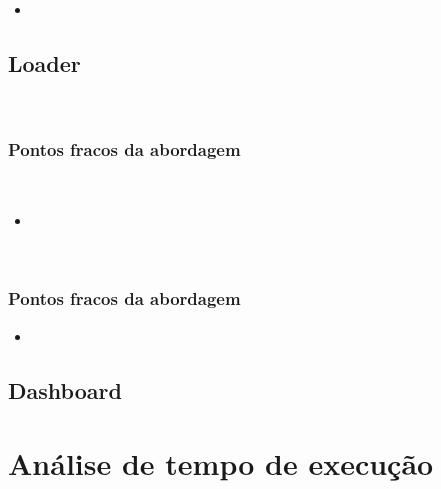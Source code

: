 \documentclass[a4paper,12pt]{article}
\begin{document}
\begin{itemize}
    \item \textbf{} 

\end{itemize}


\subsection*{Loader}
\\



\subsubsection*{Pontos fracos da abordagem}
\\
\begin{itemize}
    \item \textbf{} 
    
\end{itemize}

\vspace{1em}

\\
\subsubsection*{Pontos fracos da abordagem}

\begin{itemize}
    \item \textbf{} 

\end{itemize}



\subsection*{Dashboard}

\section{Análise de tempo de execução}
\end{document}
